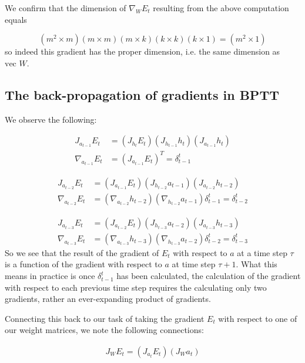 We confirm that the dimension of $\nabla_W E_t$ resulting from the above computation equals

\begin{equation*}
(m^2 \times m)(m \times m)(m \times k)(k \times k)(k \times 1) = (m^2 \times 1)
\end{equation*}
%
so indeed this gradient has the proper dimension, i.e. the same dimension as $\mbox{vec } W$.

\subsection{The back-propagation of gradients in BPTT}

We observe the following:

\begin{align*}
  J_{a_{t-1}} E_t & = (J_{h_t} E_t)(J_{h_{t-1}} h_t)(J_{a_{t-1}} h_t) \\
  \nabla_{a_{t-1}} E_t & = (J_{a_{t-1}} E_t)^T = \delta_{t-1}^t
\end{align*}

\begin{align*}
  J_{a_{t-2}} E_t & = (J_{a_{t-1}} E_t)(J_{h_{t-2}} a_{t-1})(J_{a_{t-2}} h_{t-2}) \\
  \nabla_{a_{t-2}} E_t & = (\nabla_{a_{t-2}} h_{t-2}) (\nabla_{h_{t-2}} a_{t-1}) \delta_{t-1}^t = \delta_{t-2}^t
\end{align*}

\begin{align*}
  J_{a_{t-3}} E_t & = (J_{a_{t-2}} E_t)(J_{h_{t-3}} a_{t-2})(J_{a_{t-3}} h_{t-3}) \\
  \nabla_{a_{t-3}} E_t & = (\nabla_{a_{t-3}} h_{t-3}) (\nabla_{h_{t-3}} a_{t-2}) \delta_{t-2}^t = \delta_{t-3}^t
\end{align*}
%
So we see that the result of the gradient of $E_t$ with respect to $a$ at a time step $\tau$ is a function of the gradient with respect to $a$ at time step $\tau + 1$. What this means in practice is once $\delta_{t-1}^t$ has been calculated, the calculation of the gradient with respect to each previous time step requires the calculating only two gradients, rather an ever-expanding product of gradients.

Connecting this back to our task of taking the gradient $E_t$ with respect to one of our weight matrices, we note the following connections:

\begin{align*}
J_{W} E_t = (J_{a_t} E_t)(J_W a_t)
\end{align*}

